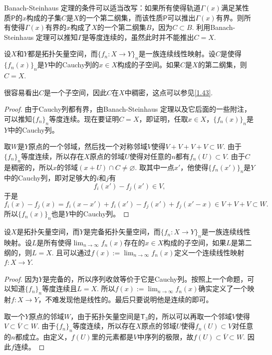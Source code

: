 Banach-Steinhaus 定理的条件可以适当改写：如果所有使得轨道$\Gamma(x)$满足某性质$\mathsf{P}$的$x$构成的子集$C$是$X$的一个第二纲集，而该性质$\mathsf{P}$可以推出$\Gamma(x)$有界。则所有使得$\Gamma(x)$有界的$x$构成了$X$的一个第二纲集$B$，因为$C\subset B$. 利用Banach-Steinhaus 定理可以推知$\Gamma$是等度连续的，虽然此时并不能推出$C=X$.

\begin{pro}
	设$X$和$Y$都是拓扑矢量空间，而$\{f_n:X\to Y\}_n$是一族连续线性映射。设$C$是使得$\{f_n(x)\}_n$是$Y$中的Cauchy列的$x\in X$构成的子空间。如果$C$是$X$的第二纲集，则$C=X$.
\end{pro}

很容易看出$C$是一个子空间，因此$C$在$X$中稠密，这点可以参见\ref{1.43}.

\begin{proof}
	由于Cauchy列都有界，由Banach-Steinhaus 定理以及它后面的一些附注，可以推知$\{f_n\}_n$等度连续。现在要证明$C=X$，即证明，任取$x\in X$，$\{f_n(x)\}_n$是$Y$中的Cauchy列。

	取$W$是$Y$原点的一个邻域，然后找一个对称邻域$V$使得$V+V+V+V\subset W$. 由于$\{f_n\}_n$等度连续，所以存在$X$原点的邻域$U$使得对任意的$n$都有$f_n(U)\subset V$. 由于$C$是稠密的，所以$x$的邻域$(x+U)\cap C\neq \varnothing$. 取其中一点$x'$，他使得$\{f_n(x')\}_n$是$Y$中的Cauchy列，即对足够大的$i$和$j$有
	\[
	f_i(x')-f_j(x')\in V,
	\]
	于是
	\[
	f_i(x)-f_j(x)=f_i(x-x')+f_i(x')-f_j(x')+f_j(x'-x)\in V+V+V\subset W.
	\]
	所以$\{f_n(x)\}_n$也是$Y$中的Cauchy列。
\end{proof}

\begin{thm}
设$X$是拓扑矢量空间，而$Y$是完备拓扑矢量空间，而$\{f_n:X\to Y\}_n$是一族连续线性映射。设$L$是所有使得$\lim_{n\to \infty}f_n(x)$存在的$x\in X$构成的子空间，如果$L$是第二纲的，则$L=X$. 且可以通过$f(x):=\lim_{n\to \infty}f_n(x)$定义一个连续线性映射$f:X\to Y$.
\end{thm}

\begin{proof}
因为$Y$是完备的，所以序列收敛等价于它是Cauchy列。按照上一个命题，可以知道$\{f_n\}_n$等度连续且$L=X$. 所以$f(x):=\lim_{n\to \infty}f_n(x)$确实定义了一个映射$f:X\to Y$，不难发现他是线性的。最后只要说明他是连续的即可。

取一个$Y$原点的邻域$W$，由于拓扑矢量空间是$\mathsf{T}_3$的，所以可以再取一个邻域$V$使得$V\subset \overline{V}\subset W$. 由于$\{f_n\}_n$等度连续，所以存在$X$原点的邻域$U$使得$f_n(U)\subset V$对任意的$n$都成立。由定义，$f(U)$里的元素都是$V$中序列的极限，故$f(U)\subset \overline{V}\subset W$. 因此$f$连续。
\end{proof}

